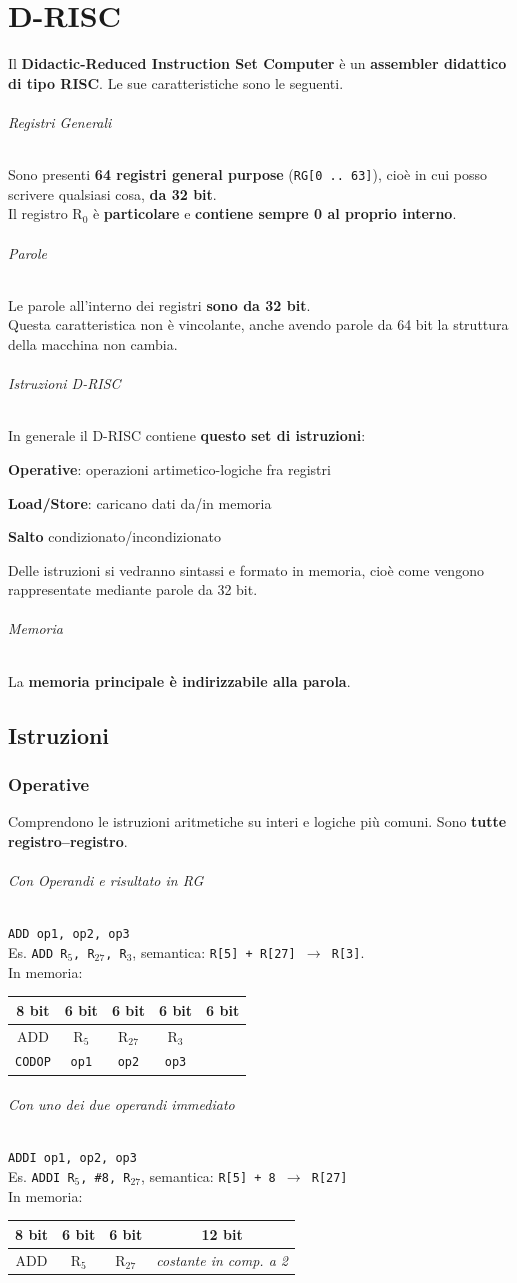 \documentclass[10pt]{report}
\begin{document}
\chapter{D-RISC}
Il \textbf{Didactic-Reduced Instruction Set Computer} è un \textbf{assembler didattico di tipo RISC}. Le sue caratteristiche sono le seguenti.
\subparagraph{Registri Generali} Sono presenti \textbf{64 registri general purpose} (\texttt{RG[0 .. 63]}), cioè in cui posso scrivere qualsiasi cosa, \textbf{da 32 bit}.\\
Il registro R$_0$ è \textbf{particolare} e \textbf{contiene sempre 0 al proprio interno}.
\subparagraph{Parole} Le parole all'interno dei registri \textbf{sono da 32 bit}.\\
Questa caratteristica non è vincolante, anche avendo parole da 64 bit la struttura della macchina non cambia.
\subparagraph{Istruzioni D-RISC} In generale il D-RISC contiene \textbf{questo set di istruzioni}:
\begin{list}{}{}
	\item \textbf{Operative}: operazioni artimetico-logiche fra registri
	\item \textbf{Load/Store}: caricano dati da/in memoria
	\item \textbf{Salto} condizionato/incondizionato
\end{list}
Delle istruzioni si vedranno sintassi e formato in memoria, cioè come vengono rappresentate mediante parole da 32 bit.
\subparagraph{Memoria} La \textbf{memoria principale è indirizzabile alla parola}.
\section{Istruzioni}
\subsection{Operative}
Comprendono le istruzioni aritmetiche su interi e logiche più comuni. Sono \textbf{tutte registro--registro}.
\subparagraph{Con Operandi e risultato in RG} \texttt{ADD op1, op2, op3}\\
Es. \texttt{ADD R$_5$, R$_{27}$, R$_3$}, semantica: \texttt{R[5] + R[27] $\rightarrow$ R[3]}.\\
In memoria: \begin{tabular}{| c | c | c | c | c |}
\hline
8 bit & 6 bit & 6 bit & 6 bit & 6 bit \\
\hline
ADD & R$_5$ & R$_{27}$ & R$_3$ & \\
\texttt{CODOP} & \texttt{op1} & \texttt{op2} & \texttt{op3} & \\
\hline
\end{tabular}
\subparagraph{Con uno dei due operandi immediato} \texttt{ADDI op1, op2, op3}\\
Es. \texttt{ADDI R$_5$, \#8, R$_{27}$}, semantica: \texttt{R[5] + 8 $\rightarrow$ R[27]}\\
In memoria: \begin{tabular}{| c | c | c | c |}
\hline
8 bit & 6 bit & 6 bit & 12 bit \\
\hline
ADD & R$_5$ & R$_{27}$ & \textit{costante in comp. a 2} \\
\hline
\end{tabular}
\end{document}
